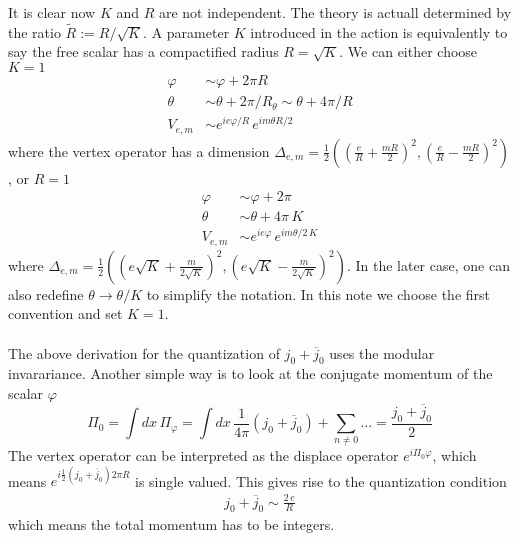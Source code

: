 It is clear now $K$ and $R$ are not independent. The theory is actuall determined by the ratio $\tilde{R} := R/\sqrt{K}$. A parameter $K$ introduced in the action is equivalently to say the free scalar has a compactified radius $R = \sqrt{K}$. We can either choose $K=1$
\begin{equation}
	\begin{aligned}
		\varphi &\sim \varphi + 2\pi R \\
		\theta &\sim \theta + 2\pi/R_\theta \sim \theta + 4\pi/R \\
		V_{e,m} &\sim e^{ie\varphi/R}\,e^{im\theta R/2}
	\end{aligned}
\end{equation}
where the vertex operator has a dimension $\Delta_{e,m} = \frac{1}{2}\left(\left(\frac{e}{R}+\frac{mR}{2}\right)^2,\left(\frac{e}{R}-\frac{mR}{2}\right)^2\right)$, or $R=1$
\begin{equation}
	\begin{aligned}
		\varphi &\sim \varphi + 2\pi \\
		\theta &\sim \theta + 4\pi\,K \\
		V_{e,m} &\sim e^{ie\varphi}\,e^{im\theta/2\,K}
	\end{aligned}
\end{equation}
where $\Delta_{e,m} = \frac{1}{2}\left(\left(e\sqrt{K}+\frac{m}{2\sqrt{K}}\right)^2,\left(e\sqrt{K}-\frac{m}{2\sqrt{K}}\right)^2\right)$. In the later case, one can also redefine $\theta \rightarrow \theta / K$ to simplify the notation. In this note we choose the first convention and set $K=1$. \\

 \\
 The above derivation for the quantization of $j_0 + \overline{j}_0$ uses the modular invarariance. Another simple way is to look at the conjugate momentum of the scalar $\varphi$
 \begin{equation}
	\Pi_0 = \int dx \, \Pi_\varphi = \int dx \, \frac{1}{4\pi} \left(j_0 + \overline{j}_0\right) + \sum_{n\neq0}... = \frac{j_0+\overline{j}_0}{2}
 \end{equation} 
The vertex operator can be interpreted as the displace operator $e^{i\Pi_0 \varphi}$, which means $e^{i\frac{1}{2}\left(j_0+\overline{j}_0\right)2\pi R}$ is single valued. This gives rise to the quantization condition
\begin{equation}
	\begin{aligned}
		j_0 + \overline{j}_0 \sim \frac{2\,e}{R}
	\end{aligned}
\end{equation}
which means the total momentum has to be integers.

